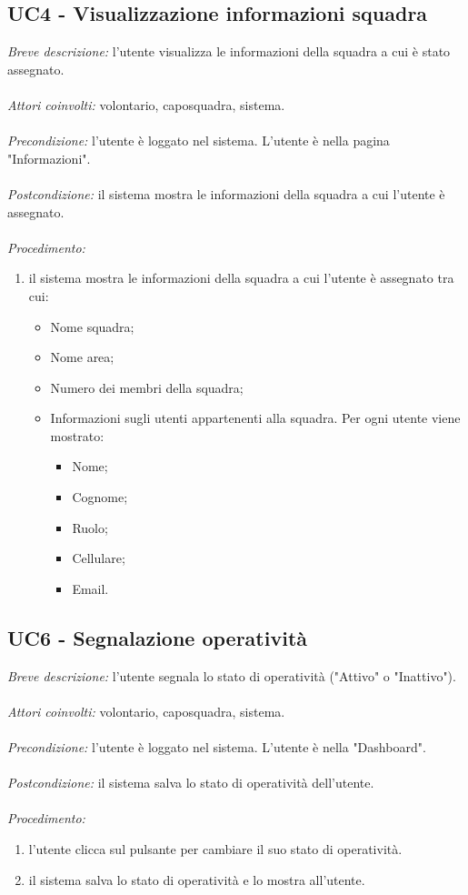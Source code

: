 \subsection{UC4 - Visualizzazione informazioni squadra}
\textit{Breve descrizione:} l'utente visualizza le informazioni della squadra a cui è stato assegnato.
\\
\\
\textit{Attori coinvolti:} volontario, caposquadra, sistema.
\\
\\
\textit{Precondizione:} l'utente è loggato nel sistema. L'utente è nella pagina "Informazioni".
\\
\\
\textit{Postcondizione:} il sistema mostra le informazioni della squadra a cui l'utente è assegnato.
\\
\\
\textit{Procedimento:}
\begin{enumerate}
	\item il sistema mostra le informazioni della squadra a cui l'utente è assegnato tra cui:
	\begin{itemize}
		\item Nome squadra;
		\item Nome area;
		\item Numero dei membri della squadra;
		\item Informazioni sugli utenti appartenenti alla squadra. Per ogni utente viene mostrato:
		\begin{itemize}
			\item Nome;
			\item Cognome;
			\item Ruolo;
			\item Cellulare;
			\item Email.
		\end{itemize}
	\end{itemize}
\end{enumerate}

\subsection{UC6 - Segnalazione operatività}
\textit{Breve descrizione:} l'utente segnala lo stato di operatività ("Attivo" o "Inattivo"). 
\\
\\
\textit{Attori coinvolti:} volontario, caposquadra, sistema.
\\
\\
\textit{Precondizione:} l'utente è loggato nel sistema. L'utente è nella "Dashboard".
\\
\\
\textit{Postcondizione:} il sistema salva lo stato di operatività dell'utente.
\\
\\
\textit{Procedimento:}
\begin{enumerate}
	\item l'utente clicca sul pulsante per cambiare il suo stato di operatività.
	\item il sistema salva lo stato di operatività e lo mostra all'utente.
\end{enumerate}



